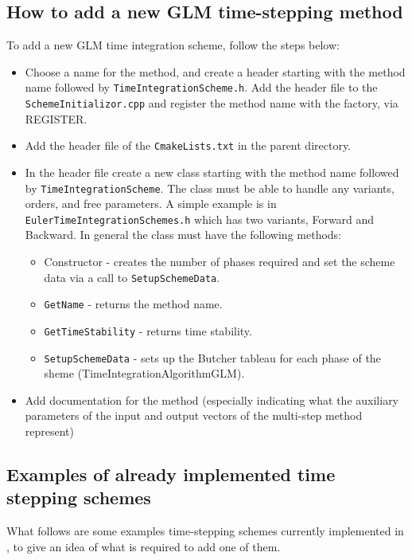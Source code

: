 \subsection{How to add a new GLM time-stepping method}

To add a new GLM time integration scheme, follow the steps below:
\begin{itemize}
\item Choose a name for the method, and create a header starting with
  the method name followed by \texttt{TimeIntegrationScheme.h}.  Add the
  header file to the \texttt{SchemeInitializor.cpp} and register the
  method name with the factory, via REGISTER.
\item Add the header file of the \texttt{CmakeLists.txt} in the parent
  directory.
\item In the header file create a new class starting with the method
  name followed by \texttt{TimeIntegrationScheme}. The class must be
  able to handle any variants, orders, and free parameters. A simple
  example is in \texttt{EulerTimeIntegrationSchemes.h} which has two
  variants, Forward and Backward. In general the class must have the
  following methods:
\begin{itemize}
  \item Constructor - creates the number of phases required and set
    the scheme data via a call to \texttt{SetupSchemeData}.
  \item \texttt{GetName} - returns the method name.
  \item \texttt{GetTimeStability} - returns time stability.
  \item \texttt{SetupSchemeData} - sets up the Butcher tableau for
    each phase of the sheme (TimeIntegrationAlgorithmGLM).
\end{itemize}

\item Add documentation for the method (especially indicating what the
  auxiliary parameters of the input and output vectors of the
  multi-step method represent)
\end{itemize}

\subsection{Examples of already implemented time stepping schemes}

What follows are some examples time-stepping schemes currently
implemented in {\nek}, to give an idea of what is required to add one
of them.

